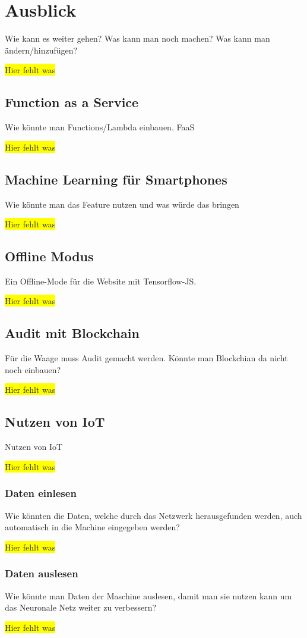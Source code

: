 \chapter{Ausblick}
\label{ch:ausblick}
Wie kann es weiter gehen? Was kann man noch machen? Was kann man ändern/hinzufügen?

\colorbox{yellow}{Hier fehlt was}

\section{Function as a Service}
Wie könnte man Functions/Lambda einbauen. FaaS

\colorbox{yellow}{Hier fehlt was}

\section{Machine Learning für Smartphones}
Wie könnte man das Feature nutzen und was würde das bringen

\colorbox{yellow}{Hier fehlt was}

\section{Offline Modus}
Ein Offline-Mode für die Website mit Tensorflow-JS.

\colorbox{yellow}{Hier fehlt was}

\section{Audit mit Blockchain}
Für die Waage muss Audit gemacht werden. Könnte man Blockchian da nicht noch einbauen?

\colorbox{yellow}{Hier fehlt was}

\section{Nutzen von IoT}
Nutzen von IoT

\colorbox{yellow}{Hier fehlt was}

\subsection{Daten einlesen}
Wie könnten die Daten, welche durch das Netzwerk herausgefunden werden, auch automatisch in die Machine eingegeben werden?

\colorbox{yellow}{Hier fehlt was}

\subsection{Daten auslesen}
Wie könnte man Daten der Maschine auslesen, damit man sie nutzen kann um das Neuronale Netz weiter zu verbessern?

\colorbox{yellow}{Hier fehlt was}